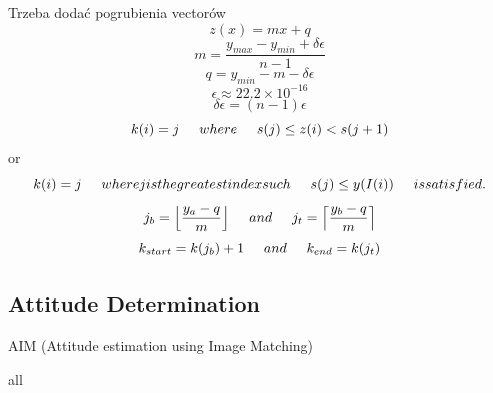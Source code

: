 \documentclass[12pt,a4paper,oneside]{article}
\begin{document}
\cite{mortari2013k}\par
\cite{mortari1996fast}\par
\cite{mortari2000k}\par
Trzeba dodać pogrubienia vectorów
\begin{equation}
z(x) = mx + q
\end{equation}
\begin{equation}
m = \frac{y_{max} - y_{min} + \delta\epsilon}{n - 1}
\end{equation}
\begin{equation}
q = y_{min} - m - \delta\epsilon
\end{equation}
\begin{equation}
\epsilon \approx 22.2 \times 10^{-16}
\end{equation}
\begin{equation}
\delta\epsilon = (n - 1)\epsilon
\end{equation}
\begin{equation}
k(i) = j \hspace{0.5cm} where \hspace{0.5cm} s(j) \leq z(i) < s(j + 1)
\end{equation}
or
\begin{equation}
k(i) = j \hspace{0.5cm} where j is the greatest index such \hspace{0.5cm} s(j) \leq y(I(i)) \hspace{0.5cm} is satisfied.
\end{equation}
\begin{equation}
j_b = \Big\lfloor\frac{y_a - q}{m}\Big\rfloor \hspace{0.5cm} and \hspace{0.5cm} j_t = \Big\lceil\frac{y_b - q}{m}\Big\rceil
\end{equation}
\begin{equation}
k_{start} = k(j_b) + 1 \hspace{0.5cm} and \hspace{0.5cm} k_{end} = k(j_t)
\end{equation}
\subsection{Attitude Determination}
\cite{jenssen2011comparison}\par
AIM (Attitude estimation using Image Matching)\cite{delabie2012highly}\par
all \cite{hall2003spacecraft} \cite{markley1999estimate}
\end{document}
